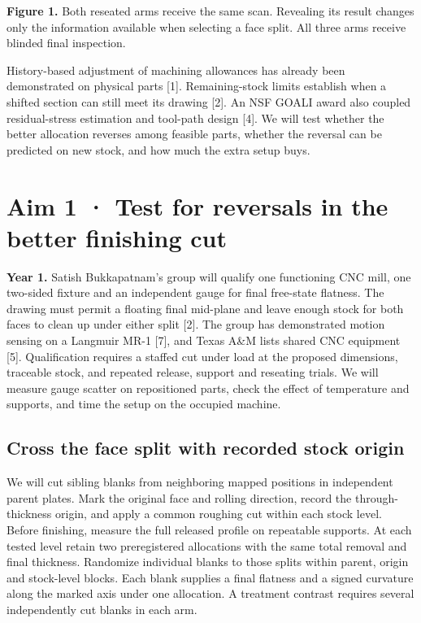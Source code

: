 \documentclass[11pt,letterpaper]{article}
\begin{document}
{\small\textbf{Figure 1.} Both reseated arms receive the same scan. Revealing its result changes only the information available when selecting a face split. All three arms receive blinded final inspection.}

History-based adjustment of machining allowances has already been demonstrated on physical parts [1]. Remaining-stock limits establish when a shifted section can still meet its drawing [2]. An NSF GOALI award also coupled residual-stress estimation and tool-path design [4]. We will test whether the better allocation reverses among feasible parts, whether the reversal can be predicted on new stock, and how much the extra setup buys.

\newpage

\section*{Aim 1 · Test for reversals in the better finishing cut}

\textbf{Year 1.} Satish Bukkapatnam's group will qualify one functioning CNC mill, one two-sided fixture and an independent gauge for final free-state flatness. The drawing must permit a floating final mid-plane and leave enough stock for both faces to clean up under either split [2]. The group has demonstrated motion sensing on a Langmuir MR-1 [7], and Texas A\&M lists shared CNC equipment [5]. Qualification requires a staffed cut under load at the proposed dimensions, traceable stock, and repeated release, support and reseating trials. We will measure gauge scatter on repositioned parts, check the effect of temperature and supports, and time the setup on the occupied machine.

\subsection*{Cross the face split with recorded stock origin}

We will cut sibling blanks from neighboring mapped positions in independent parent plates. Mark the original face and rolling direction, record the through-thickness origin, and apply a common roughing cut within each stock level. Before finishing, measure the full released profile on repeatable supports. At each tested level retain two preregistered allocations with the same total removal and final thickness. Randomize individual blanks to those splits within parent, origin and stock-level blocks. Each blank supplies a final flatness and a signed curvature along the marked axis under one allocation. A treatment contrast requires several independently cut blanks in each arm.
\end{document}
